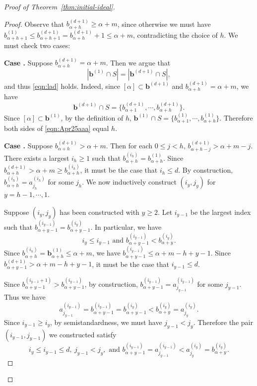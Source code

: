\documentclass[12pt,reqno]{amsart}
\theoremstyle{definition}
\newcommand{\RNum}[1]{\uppercase\expandafter{\romannumeral #1\relax}}
\newcommand{\bb}{\mathbf b}
\begin{document}
{\begin{proof}[Proof of Theorem~\ref{thm:initial-ideal}]
\begin{proof}
        Observe that $b_{\alpha+h}^{(d+1)}\ge \alpha+m$, since otherwise we must have $b_{\alpha+h+1}^{(1)}\le b_{\alpha+h+1}^{(d+1)}=b_{\alpha+h}^{(d+1)}+1\le \alpha+m$, 
        contradicting the choice of $h$. We must check two cases: 

        \noindent\textbf{Case \RNum{1}.} Suppose  $b^{(d+1)}_{\alpha+h}=\alpha+m$. Then we argue that 
        \begin{equation}\label{eqn:Apr25aaa}
    |\bb^{(1)}\cap S |=|\bb^{(d+1)}\cap S|,
        \end{equation}
        and thus \eqref{eqn:lad} holds.
        Indeed, since $[\alpha]\subset \bb^{(d+1)}$ and $b^{(d+1)}_{\alpha+h} = \alpha+m$, we have $$\bb^{(d+1)}\cap S = \{b^{(d+1)}_{\alpha+1},\cdots,b^{(d+1)}_{\alpha+h}\}.$$ Since $[\alpha]\subset \bb^{(1)}$, by the  definition of $h$, $\bb^{(1)}\cap S =\{b^{(1)}_{\alpha+1},\cdots,b^{(1)}_{\alpha+h}\}$. Therefore both sides of \eqref{eqn:Apr25aaa} equal $h$.


        \noindent\textbf{Case \RNum{2}.} Suppose $b_{\alpha+h}^{(d+1)}>\alpha+m$. 
        Then for each $0\le j< h$, $b_{\alpha+h-j}^{(d+1)}>\alpha+m-j$. 
        There exists a largest $i_h\ge 1$ such that $b^{(i_h)}_{\alpha+h}=b^{(1)}_{\alpha+h}$. Since $b_{\alpha+h}^{(d+1)}>\alpha+m\geq b^{(i_h)}_{\alpha+h}$, it must be the case that $i_h\le d$.
        By construction, $b^{(i_h)}_{\alpha+h}=a^{(i_h)}_{j_h}$ for some $j_h$. We now inductively construct $(i_y,j_y)$ for $y = h-1,\cdots, 1$.    
        
        Suppose $(i_y,j_y)$ has been constructed with $y\geq 2$. Let $i_{y-1}$ be the largest index such that
        $b^{(i_{y-1})}_{\alpha+y-1}=b^{(i_y)}_{\alpha+y-1}$. In particular, we have 
        \[i_{y}\leq i_{y-1} \text{ and } b^{(i_{y-1})}_{\alpha+y-1}< b^{(i_y)}_{\alpha+y}.\]
        Since $b^{(i_h)}_{\alpha+h} = \bb^{(1)}_{\alpha+h}\leq \alpha+m$, we have $b^{(i_{y-1})}_{\alpha+y-1} \leq \alpha+m-h+y-1$. Since $b^{(d+1)}_{\alpha+y-1}>\alpha+m-h+y-1$, it must be the case that $i_{y-1}\le d$.       
        
        Since $b^{(i_{y-1}+1)}_{\alpha+y-1}>b^{(i_{y-1})}_{\alpha+y-1}$,
        by construction, $b^{(i_{y-1})}_{\alpha+y-1}=a^{(i_{y-1})}_{j_{y-1}}$ for some $j_{y-1}$. Thus we have
        $$a^{(i_{y-1})}_{j_{y-1}} = b^{(i_{y-1})}_{\alpha+y-1}=b^{(i_{y})}_{\alpha+y-1}<b^{(i_{y})}_{\alpha+y} = a^{(i_y)}_{j_y}.$$
        Since $i_{y-1}\ge i_y$, by semistandardness, we must have $j_{y-1}<j_y$. 
        Therefore the pair $(i_{y-1},j_{y-1})$ we constructed satisfy
        \begin{equation}\label{eqn:May12aaa}
             i_{y}\leq i_{y-1}\leq d,\ j_{y-1}<j_y,\text{ and }  b^{(i_{y-1})}_{\alpha+y-1}=a^{(i_{y-1})}_{j_{y-1}}<a^{(i_y)}_{j_y} = b^{(i_y)}_{\alpha+y}.
        \end{equation}
     

\end{proof}
\end{proof}}
\end{document}
